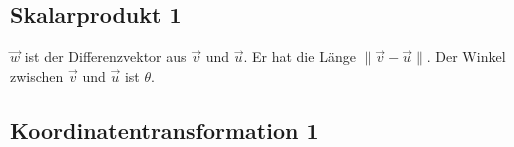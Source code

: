 \documentclass{article}
\begin{document}
    \subsection{Skalarprodukt 1}
    \begin{figure}[h]
        \centering
    \end{figure}
    $\vec{w}$ ist der Differenzvektor aus $\vec{v}$ und $\vec{u}$.
    Er hat die Länge $\lVert \vec{v} - \vec{u} \rVert$.
    Der Winkel zwischen $\vec{v}$ und $\vec{u}$ ist $\theta$.

    \newpage

    \subsection{Koordinatentransformation 1}
    \begin{figure}[h]
        \centering
    \end{figure}
\end{document}
